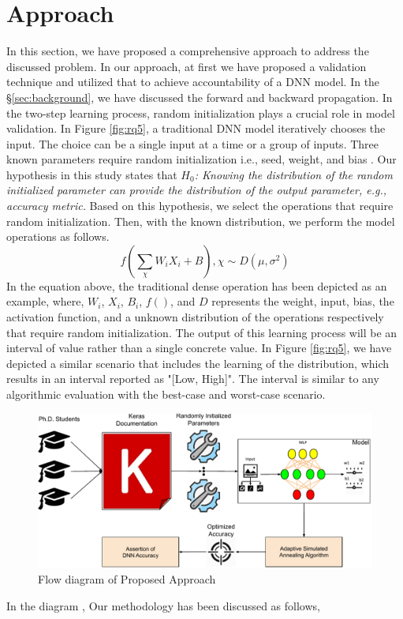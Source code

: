 \section{Approach}
\label{sec:approach}
In this section, we have proposed a comprehensive approach to address the discussed problem. In our approach, at first we have proposed a validation technique and utilized that to achieve accountability of a DNN model. In the \S\ref{sec:background}, we have discussed the forward and backward propagation. In the two-step learning process, random initialization plays a crucial role in model validation. In Figure \ref{fig:rq5}, a traditional DNN model iteratively chooses the input. The choice can be a single input at a time or a group of inputs. Three known parameters require random initialization i.e., seed, weight, and bias \cite{sutskever2013importance}. Our hypothesis in this study states that \emph{$H_0$: Knowing the distribution of the random initialized parameter can provide the distribution of the output parameter, e.g., accuracy metric.} Based on this hypothesis, we select the operations that require random initialization. Then, with the known distribution, we perform the model operations as follows.
\begin{equation}
f(\sum_{\chi}{W_iX_i+B}), \chi\sim D(\mu, \sigma^2)
\end{equation}
In the equation above, the traditional dense operation has been depicted as an example, where, $W_i$, $X_i$, $B_i$, $f()$, and $D$ represents the weight, input, bias, the activation function, and a unknown distribution of the operations respectively that require random initialization. The output of this learning process will be an interval of value rather than a single concrete value. In Figure \ref{fig:rq5}, we have depicted a similar scenario that includes the learning of the distribution, which results in an interval reported as "[Low, High]". The interval is similar to any algorithmic evaluation with the best-case and worst-case scenario. 
\begin{figure}
	\includegraphics[width=0.8\linewidth]{approach}
	\centering
	\caption{Flow diagram of Proposed Approach}
	\label{fig:flow}
\end{figure}
In the diagram , 
Our methodology has been discussed as follows,
